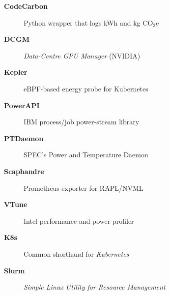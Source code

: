 \begin{description}
\item[\textbf{CodeCarbon}] Python wrapper that logs kWh and kg CO\(_2\)e
\item[\textbf{DCGM}] \textit{Data-Centre GPU Manager} (NVIDIA)
\item[\textbf{Kepler}] eBPF-based energy probe for Kubernetes
\item[\textbf{PowerAPI}] IBM process/job power-stream library
\item[\textbf{PTDaemon}] SPEC’s Power and Temperature Daemon
\item[\textbf{Scaphandre}] Prometheus exporter for RAPL/NVML
\item[\textbf{VTune}] Intel performance and power profiler

\item[\textbf{K8s}] Common shorthand for \textit{Kubernetes}
\item[\textbf{Slurm}] \textit{Simple Linux Utility for Resource Management}


\end{description}
